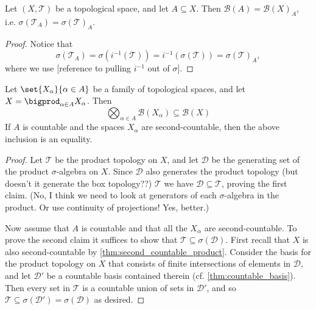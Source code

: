 \documentclass[article, a4paper, 11pt, oneside]{memoir}
\numberwithin{equation}{chapter}
\newcommand{\calT}{\mathcal{T}}
\newcommand{\calD}{\mathcal{D}}
\newcommand{\borel}{\mathcal{B}}
\begin{document}
\begin{proposition}
    Let $(X, \calT)$ be a topological space, and let $A \subseteq X$. Then $\borel(A) = \borel(X)_A$, i.e. $\sigma(\calT_A) = \sigma(\calT)_A$.
\end{proposition}

\begin{proof}
    Notice that
    \begin{equation*}
        \sigma(\calT_A)
            = \sigma(i^{-1}(\calT))
            = i^{-1}(\sigma(\calT))
            = \sigma(\calT)_A,
    \end{equation*}
    where we use [reference to pulling $i^{-1}$ out of $\sigma$].
\end{proof}



\begin{proposition}
    Let $\set{X_\alpha}{\alpha \in A}$ be a family of topological spaces, and let $X = \bigprod_{\alpha \in A} X_\alpha$. Then
    \begin{equation*}
        \bigotimes_{\alpha \in A} \borel(X_\alpha)
            \subseteq \borel(X)
    \end{equation*}
    If $A$ is countable and the spaces $X_\alpha$ are second-countable, then the above inclusion is an equality.
\end{proposition}

\begin{proof}
    Let $\calT$ be the product topology on $X$, and let $\calD$ be the generating set of the product $\sigma$-algebra on $X$. Since $\calD$ also generates the product topology (but doesn't it generate the box topology??) $\calT$ we have $\calD \subseteq \calT$, proving the first claim. (No, I think we need to look at generators of each $\sigma$-algebra in the product. Or use continuity of projections! Yes, better.)
    
    Now assume that $A$ is countable and that all the $X_\alpha$ are second-countable. To prove the second claim it suffices to show that $\calT \subseteq \sigma(\calD)$. First recall that $X$ is also second-countable by \cref{thm:second_countable_product}. Consider the basis for the product topology on $X$ that consists of finite intersections of elements in $\calD$, and let $\calD'$ be a countable basis contained therein (cf. \cref{thm:countable_basis}). Then every set in $\calT$ is a countable union of sets in $\calD'$, and so $\calT \subseteq \sigma(\calD') = \sigma(\calD)$ as desired.
\end{proof}
\end{document}
